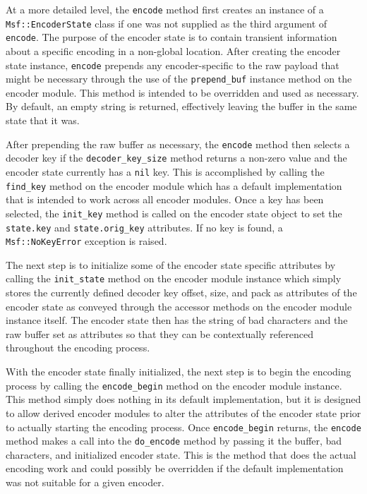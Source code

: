 \documentclass{report}
\begin{document}
\par
At a more detailed level, the \texttt{encode} method first creates
an instance of a \texttt{Msf::EncoderState} class if one was not
supplied as the third argument of \texttt{encode}.  The purpose of
the encoder state is to contain transient information about a
specific encoding in a non-global location. After creating the
encoder state instance, \texttt{encode} prepends any
encoder-specific to the raw payload that might be necessary through
the use of the \texttt{prepend\_buf} instance method on the encoder
module.  This method is intended to be overridden and used as
necessary.  By default, an empty string is returned, effectively
leaving the buffer in the same state that it was.

\par
After prepending the raw buffer as necessary, the \texttt{encode}
method then selects a decoder key if the \texttt{decoder\_key\_size}
method returns a non-zero value and the encoder state currently has
a \texttt{nil} key.  This is accomplished by calling the
\texttt{find\_key} method on the encoder module which has a default
implementation that is intended to work across all encoder modules.
Once a key has been selected, the \texttt{init\_key} method is
called on the encoder state object to set the \texttt{state.key} and
\texttt{state.orig\_key} attributes.  If no key is found, a
\texttt{Msf::NoKeyError} exception is raised.

\par
The next step is to initialize some of the encoder state specific
attributes by calling the \texttt{init\_state} method on the encoder
module instance which simply stores the currently defined decoder
key offset, size, and pack as attributes of the encoder state as
conveyed through the accessor methods on the encoder module instance
itself.  The encoder state then has the string of bad characters and
the raw buffer set as attributes so that they can be contextually
referenced throughout the encoding process.

\par
With the encoder state finally initialized, the next step is to
begin the encoding process by calling the \texttt{encode\_begin}
method on the encoder module instance.  This method simply does
nothing in its default implementation, but it is designed to allow
derived encoder modules to alter the attributes of the encoder state
prior to actually starting the encoding process.  Once
\texttt{encode\_begin} returns, the \texttt{encode} method makes a
call into the \texttt{do\_encode} method by passing it the buffer,
bad characters, and initialized encoder state.  This is the method
that does the actual encoding work and could possibly be overridden
if the default implementation was not suitable for a given encoder.
\end{document}
